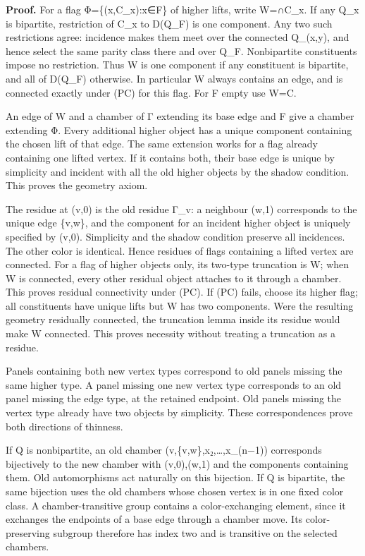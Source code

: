 \documentclass[
  10pt,
  letterpaper,
]{article}
\begin{document}
\textbf{Proof.} For a flag Φ=\{(x,C\_x):x∈F\} of higher lifts, write
W=∩C\_x. If any Q\_x is bipartite, restriction of C\_x to D(Q\_F) is one
component. Any two such restrictions agree: incidence makes them meet
over the connected Q\_(x,y), and hence select the same parity class
there and over Q\_F. Nonbipartite constituents impose no restriction.
Thus W is one component if any constituent is bipartite, and all of
D(Q\_F) otherwise. In particular W always contains an edge, and is
connected exactly under (PC) for this flag. For F empty use W=C.

An edge of W and a chamber of Γ extending its base edge and F give a
chamber extending Φ. Every additional higher object has a unique
component containing the chosen lift of that edge. The same extension
works for a flag already containing one lifted vertex. If it contains
both, their base edge is unique by simplicity and incident with all the
old higher objects by the shadow condition. This proves the geometry
axiom.

The residue at (v,0) is the old residue Γ\_v: a neighbour (w,1)
corresponds to the unique edge \{v,w\}, and the component for an
incident higher object is uniquely specified by (v,0). Simplicity and
the shadow condition preserve all incidences. The other color is
identical. Hence residues of flags containing a lifted vertex are
connected. For a flag of higher objects only, its two-type truncation is
W; when W is connected, every other residual object attaches to it
through a chamber. This proves residual connectivity under (PC). If (PC)
fails, choose its higher flag; all constituents have unique lifts but W
has two components. Were the resulting geometry residually connected,
the truncation lemma inside its residue would make W connected. This
proves necessity without treating a truncation as a residue.

Panels containing both new vertex types correspond to old panels missing
the same higher type. A panel missing one new vertex type corresponds to
an old panel missing the edge type, at the retained endpoint. Old panels
missing the vertex type already have two objects by simplicity. These
correspondences prove both directions of thinness.

If Q is nonbipartite, an old chamber (v,\{v,w\},x₂,\ldots,x\_(n−1))
corresponds bijectively to the new chamber with (v,0),(w,1) and the
components containing them. Old automorphisms act naturally on this
bijection. If Q is bipartite, the same bijection uses the old chambers
whose chosen vertex is in one fixed color class. A chamber-transitive
group contains a color-exchanging element, since it exchanges the
endpoints of a base edge through a chamber move. Its color-preserving
subgroup therefore has index two and is transitive on the selected
chambers.
\end{document}

